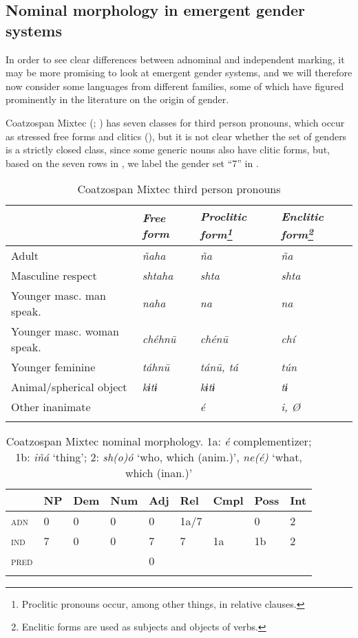 \documentclass[output=collectionpaper]{langsci/langscibook}
\begin{document}
  \subsection{Nominal morphology in emergent gender systems}
  \label{sec:WDG:4.3}

In order to see clear differences between adnominal and independent marking, it may be more promising to look at emergent gender systems, and we will therefore now consider some languages from different families, some of which have figured prominently in the literature on the origin of gender.

Coatzospan Mixtec (; \citealt[415]{Small1990}) has seven classes for third person pronouns, which occur as stressed free forms and clitics (), but it is not clear whether the set of genders is a strictly closed class, since some generic nouns also have clitic forms, but, based on the seven rows in , we label the gender set ``7'' in .

\begin{table}
\begin{tabular}{l*{3}{>{\itshape}l}}
\lsptoprule
&	\normalfont Free form	&	\normalfont Proclitic form\footnote{Proclitic pronouns occur, among other things, in relative clauses.}	&	\normalfont Enclitic form\footnote{Enclitic forms are used as subjects and objects of verbs.}\\
\midrule
Adult	&	ñaha	&	ña	&	ña	\\
Masculine respect	&	shtaha	&	shta	&	shta	\\
Younger masc. man speak.	&	naha	&	na	&	na	\\
Younger masc. woman speak.	&	chéhnū	&	chénū	&	chí	\\
Younger feminine	&	táhnū	&	tánū, tá	&	tún	\\
Animal/spherical object	&	kɨtɨ	&	kɨtɨ	&	tɨ	\\
Other inanimate	&		&	é	&	i, Ø	\\
\lspbottomrule
\end{tabular}
\caption{Coatzospan Mixtec third person pronouns\label{tab:WDG:3}}
\end{table}


\begin{table}
\begin{tabular}{*{9}{l}}
\lsptoprule
&	NP	&	Dem	&	Num	&	Adj	&	Rel	&	Cmpl	&	Poss	&	Int	\\
\midrule
\textsc{adn}	&	0	&	0	&	0	&	0	&	1a/7	&		&	0	&	2	\\
\textsc{ind}	&	7	&	0	&	0	&	7	&	7	&	1a	&	1b	&	2	\\
\textsc{pred}	&		&		&		&	0	&		&		&		&		\\
\lspbottomrule
\end{tabular}
\caption{Coatzospan Mixtec nominal morphology. 1a: \textit{é} complementizer; 1b: \textit{iñá} `thing'; 2: \textit{sh(o)ó} `who, which (anim.)', \textit{ne(é)} `what, which (inan.)'\label{tab:WDG:4}}
\end{table}
\end{document}

